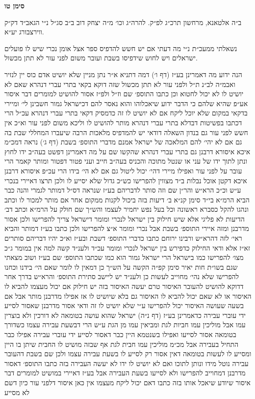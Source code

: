\documentclass[12pt, openany]{book}
\newcommand{\chapname}{}
\newcommand{\newchap}[1]{
	\addcontentsline{toc}{chapter}{#1}
	\renewcommand{\chapname}{#1}
		\begin{center}
			\textbf{%
\fontsize{16pt}{16pt}\selectfont
				#1}
		\end{center}
}
\begin{document}
\newchap{סימן טו}
\begin{multicols}{2}
ב״ה אלטאנא, מרחשון תרכ״ג לפ״ק. להרה״ג וכו׳ מ״ה יצחק דוב ב״ב סג״ל נ״י הגאב״ד דק״ק ווירצבורג יע״א.\\\vspace{0pt}

נשאלתי ממעכ״ת נ״י מה דעתי אם יש חשש להדפיס ספר אצל אומן נכרי שיש לו פועלים ישראלים ויש לחוש שידפיסו בשבת ועובר משום לפני עור לא תתן מכשול.\\\vspace{0pt}

הנה ידוע מה דאמרינן בע״ז (דף ו׳) דמה דתניא א״ר נתן מניין שלא יושיט אדם כוס יין לנזיר ואבמ״ה לב״נ ת״ל ולפני עור לא תתן מכשול שזה דוקא בקאי בתרי עברי דנהרא שאם לא יושיט לו לא יכול לחטוא וכן כתבו התוספ׳ שם וז״ל ולפ״ז אסור להושיט למומרים דבר איסור אע״פ שהיא שלהם כי הדבר ידוע שיאכלוהו והוא נאסר להם דכישראל גמור חשבינן לי׳ ומיירי בדקאי במקום שלא יוכל ליקח אם לא יושיט לו זה כדמסיק דקאי בתרי עברי דנהרא עכ״ל הרי דכתבו בפשיטות דבדלא בתרי עברי דנהרא מותר להושיט לו וליכא משום לפני עור וא״כ אין חשש לפני עור גם בנדון השאלה דודאי יש להמדפיס מלאכות הרבה שיעברו המחללי שבת בה גם אם לא יהי׳ להם המלאכה של ישראל אמנם מדברי התוספ׳ בשבת (דף ג׳) נראה דמכ״מ איכא איסורא דרבנן גם בתרי עברי דנהרא שהקשו שם על מה דאמרינן דפשט בעה״ב ידו לחוץ ונתן לתוך ידו של עני או שנטל מתוכה והכניס בעה״ב חייב ועני פטור דפטור ומותר קאמר הרי עובר על לפני עור ואפילו מיירי דהי׳ יכול ליטול גם אם לא הי׳ בידו הרי עכ״פ איסורא דרבנן איכא דקטן אוכל נבלות ב״ד מצווין להפרישו כש״כ גדול שלא יסייע לו ולכן תרצו דאיירי בנכרי ע״ש וכ״כ הרא״ש והר״ן שם וזה סותר לדבריהם בע״ז שנראה דס״ל דמותר לגמרי והנה כבר הביא הרמ״א בי״ד סימן קנ״א ב׳ דיעות בזה ביכול לקנות ממקום אחר אם מותר למכור לו וכתב ונהגו להקל כסברא ראשונה וכל בעל נפש יחמיר לעצמו והש״ך שם חולק על הרמ״א וכתב דב׳ הדיעות לא פליגי אלא שיש חילוק בין ישראל לנכרי ומומר דישראל צריך להפרישו ולכן אסור מדרבנן ומזה איירי התוספ׳ בשבת אבל נכרי ומומר א״צ להפרישו ולכן כתבו בע״ז דמותר והביא ראי׳ לזה דהרא״ש ורבינו ירוחם כתבו כדברי התוספ׳ דשבת ובע״ז וא״כ יהיו דבריהם סותרים זא״ז אלא ודאי החילוק כדפירש בין ישראל לנכרי ומומר עכ״ד ולענ״ד קשה למה אין במומר ג״כ מצו׳ להפרישו כמו בישראל הרי ישראל גמור הוא כמו שכתבו התוספ׳ שם בע״ז ושוב מצאתי שגם בשו״ת חות יאיר סימן קפ״ה הקשה על הש״ך כן דמאין לו לומר שאם הי׳ בידנו וכחנו להפרישו שלא נהי׳ מחוייב לעשות כן ולענ״ד יש ליישב סתירת התוספ׳ והרא״ש בדרך אחר דדוקא להושיט להעובר האיסור טרם יעשה האיסור בזה יש חילוק אם יכול מעצמו להביא לו האיסור או לא שאם יכול להביא לו האיסור גם בלא שיושיט לו אז אפילו מדרבנן מותר אבל אם בשעה שעושה האיסור יכול להפרישו ע״י שלא יושיט לו זה ודאי אסור מדרבנן שאסור לסייע ידי עוברי עבירה כדאמרינן בע״ז (דף נ״ה) ישראל שהוא עושה בטומאה לא דורכין ולא בוצרין עמו אבל מוליכין עמו חביות לגת ומביאין עמו מן הגת ע״ש הרי דבשעת עבירה עצמו כשדורך בטומאה אסור לסייעו ואפילו בשנטמא היין כבר דאסור לסייע ידי עוברי עבירה אפילו כבר התחיל בעבירה אבל מכ״מ מוליכין עמו חבית לגת אף שבזה מושיט לו החבית שיתן בו היין ומסייע לו לעשות בטומאה דאין אסור רק לסייע לו בשעת עבירה עצמו ולכן שם בשבת דהעובר עבירה נוטל מידו ונותן לתוכו ואם לא יושיט לו ידו לא יעשה העבירה בזה כתבו התוספ׳ דאסור מדרבנן דמחוייב להפרישו ולא לסייעו בשעת העבירה אבל בע״ז דאיירי במושיט למומרים דבר איסור שיודע שיאכל אותו בזה כתבו דאם יכול ליקח מעצמו אין כאן איסור דלפני עור כיון דשם לא מסייע 
\end{multicols}
\end{document}
